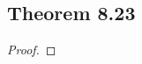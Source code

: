 \documentclass[../../main.tex]{subfiles}
\begin{document}
\subsection{Theorem 8.23}
\begin{wts}

\end{wts}
\begin{proof}

\end{proof}
\end{document}
